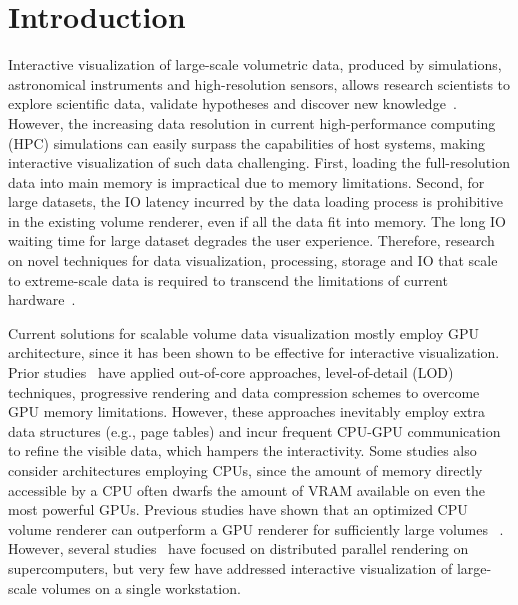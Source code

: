 


\maketitle

\section{Introduction}
\label{sec:introduction}
Interactive visualization of large-scale volumetric data, produced by
simulations, astronomical instruments and high-resolution sensors, 
allows research scientists to explore scientific data, validate
hypotheses and discover new knowledge~\cite{keim2013big}. 
However, the increasing data resolution in current high-performance
computing (HPC) simulations can easily surpass the capabilities of
host systems, making interactive visualization of such data challenging. 
First, loading the full-resolution data into main memory is impractical
due to memory limitations. Second, for large datasets, the IO latency incurred by the data 
loading process is prohibitive in the existing volume renderer,
even if all the data fit into memory.
The long IO waiting time for large dataset degrades the user experience.
Therefore, research on novel techniques for
data visualization, processing, storage and IO that scale to 
extreme-scale data is required to transcend the limitations
of current hardware~\cite{beyer2014survey}.



Current solutions for scalable volume data visualization mostly employ GPU architecture,
since it has been shown to be effective for interactive visualization. 
Prior studies~\cite{crassin2009gigavoxels,engel2011cera,hadwiger2008interactive} 
have applied out-of-core approaches, level-of-detail (LOD) techniques,
progressive rendering and data compression schemes to overcome GPU memory limitations. 
However, these approaches inevitably employ extra data structures (e.g., page tables)
and incur frequent CPU-GPU communication to refine the visible data, which hampers the interactivity. Some studies also consider architectures employing CPUs, since the amount 
of memory directly accessible by a CPU often dwarfs the amount of VRAM available on even
the most powerful GPUs. Previous studies have shown that an optimized CPU volume renderer 
can outperform a GPU renderer for sufficiently large volumes ~\cite{smelyanskiy2009,knoll2011full,wald2017ospray}. However, several studies~\cite{childs2006scalable,peterka2008parallel,howison2012hybrid}
have focused on distributed parallel rendering on supercomputers, but very few have addressed interactive visualization of large-scale volumes on a single workstation.



